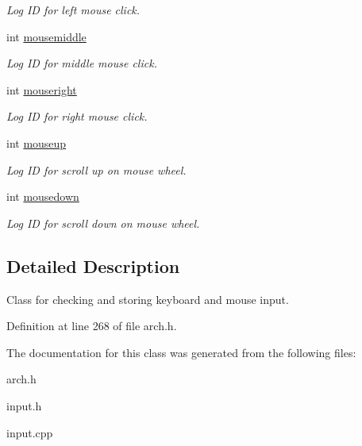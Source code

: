 \begin{DoxyCompactItemize}
\begin{DoxyCompactList}\small\item\em Log ID for left mouse click. \end{DoxyCompactList}\item 
int \hyperlink{classInput_aeada901dbf556cb13f81d8326943dd08}{mousemiddle}\hypertarget{classInput_aeada901dbf556cb13f81d8326943dd08}{}\label{classInput_aeada901dbf556cb13f81d8326943dd08}

\begin{DoxyCompactList}\small\item\em Log ID for middle mouse click. \end{DoxyCompactList}\item 
int \hyperlink{classInput_abbf0471b00d750ae25d638bca74be28f}{mouseright}\hypertarget{classInput_abbf0471b00d750ae25d638bca74be28f}{}\label{classInput_abbf0471b00d750ae25d638bca74be28f}

\begin{DoxyCompactList}\small\item\em Log ID for right mouse click. \end{DoxyCompactList}\item 
int \hyperlink{classInput_a66df7023e5db7300d0f9bcdafd140bf5}{mouseup}\hypertarget{classInput_a66df7023e5db7300d0f9bcdafd140bf5}{}\label{classInput_a66df7023e5db7300d0f9bcdafd140bf5}

\begin{DoxyCompactList}\small\item\em Log ID for scroll up on mouse wheel. \end{DoxyCompactList}\item 
int \hyperlink{classInput_a254eb8e3616257909a23449a7b87175e}{mousedown}\hypertarget{classInput_a254eb8e3616257909a23449a7b87175e}{}\label{classInput_a254eb8e3616257909a23449a7b87175e}

\begin{DoxyCompactList}\small\item\em Log ID for scroll down on mouse wheel. \end{DoxyCompactList}\end{DoxyCompactItemize}


\subsection{Detailed Description}
Class for checking and storing keyboard and mouse input. 

Definition at line 268 of file arch.\+h.



The documentation for this class was generated from the following files\+:\begin{DoxyCompactItemize}
\item 
arch.\+h\item 
input.\+h\item 
input.\+cpp\end{DoxyCompactItemize}
